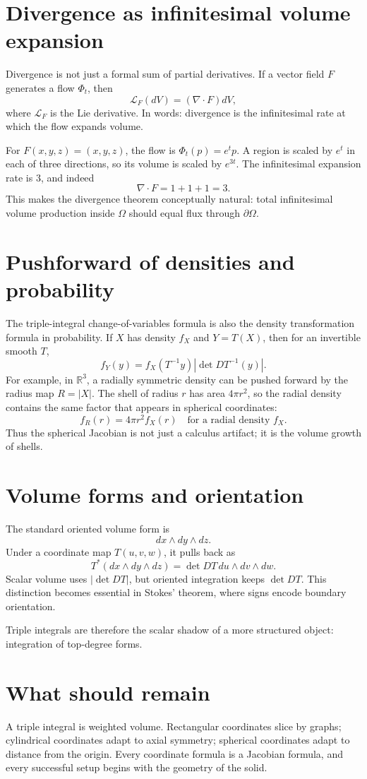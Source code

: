 \section{Divergence as infinitesimal volume expansion}

Divergence is not just a formal sum of partial derivatives.  If a vector field \(F\) generates a flow \(\Phi_t\), then
\[
  \mathcal L_F(dV)=(\nabla\cdot F)dV,
\]
where \(\mathcal L_F\) is the Lie derivative.  In words: divergence is the infinitesimal rate at which the flow expands volume.

For \(F(x,y,z)=(x,y,z)\), the flow is \(\Phi_t(p)=e^t p\).  A region is scaled by \(e^t\) in each of three directions, so its volume is scaled by \(e^{3t}\).  The infinitesimal expansion rate is \(3\), and indeed
\[
  \nabla\cdot F=1+1+1=3.
\]
This makes the divergence theorem conceptually natural: total infinitesimal volume production inside \(\Omega\) should equal flux through \(\partial\Omega\).

\section{Pushforward of densities and probability}

The triple-integral change-of-variables formula is also the density transformation formula in probability.  If \(X\) has density \(f_X\) and \(Y=T(X)\), then for an invertible smooth \(T\),
\[
  f_Y(y)=f_X(T^{-1}y)\left|\det DT^{-1}(y)\right|.
\]
For example, in \(\mathbb R^3\), a radially symmetric density can be pushed forward by the radius map \(R=|X|\).  The shell of radius \(r\) has area \(4\pi r^2\), so the radial density contains the same factor that appears in spherical coordinates:
\[
  f_R(r)=4\pi r^2 f_X(r)\quad\text{for a radial density }f_X.
\]
Thus the spherical Jacobian is not just a calculus artifact; it is the volume growth of shells.

\section{Volume forms and orientation}

The standard oriented volume form is
\[
  dx\wedge dy\wedge dz.
\]
Under a coordinate map \(T(u,v,w)\), it pulls back as
\[
  T^*(dx\wedge dy\wedge dz)
  =\det DT\,du\wedge dv\wedge dw.
\]
Scalar volume uses \(|\det DT|\), but oriented integration keeps \(\det DT\).  This distinction becomes essential in Stokes' theorem, where signs encode boundary orientation.

Triple integrals are therefore the scalar shadow of a more structured object: integration of top-degree forms.

\section{What should remain}

A triple integral is weighted volume.  Rectangular coordinates slice by graphs; cylindrical coordinates adapt to axial symmetry; spherical coordinates adapt to distance from the origin.  Every coordinate formula is a Jacobian formula, and every successful setup begins with the geometry of the solid.
